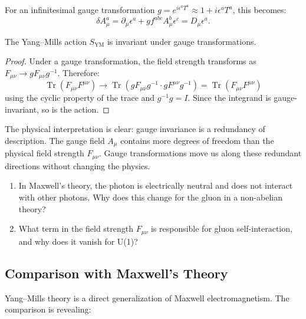 For an infinitesimal gauge transformation $g = e^{i\epsilon^a T^a} \approx 1 + i\epsilon^a T^a$, this becomes:
\[
\delta A_\mu^a = \partial_\mu \epsilon^a + g f^{abc} A_\mu^b \epsilon^c = D_\mu \epsilon^a.
\]

\begin{proposition}
The Yang--Mills action $S_{\mathrm{YM}}$ is invariant under gauge transformations.
\end{proposition}

\begin{proof}
Under a gauge transformation, the field strength transforms as $F_{\mu\nu} \to g F_{\mu\nu} g^{-1}$. Therefore:
\[
\operatorname{Tr}(F_{\mu\nu} F^{\mu\nu}) \to \operatorname{Tr}(g F_{\mu\nu} g^{-1} \cdot g F^{\mu\nu} g^{-1}) = \operatorname{Tr}(F_{\mu\nu} F^{\mu\nu})
\]
using the cyclic property of the trace and $g^{-1}g = I$. Since the integrand is gauge-invariant, so is the action.
\end{proof}

The physical interpretation is clear: gauge invariance is a redundancy of description. The gauge field $A_\mu$ contains more degrees of freedom than the physical field strength $F_{\mu\nu}$. Gauge transformations move us along these redundant directions without changing the physics.

\begin{checkyou}
\begin{enumerate}
\item In Maxwell's theory, the photon is electrically neutral and does not interact with other photons. Why does this change for the gluon in a non-abelian theory?
\item What term in the field strength $F_{\mu\nu}$ is responsible for gluon self-interaction, and why does it vanish for U(1)?
\end{enumerate}
\end{checkyou}

\subsection{Comparison with Maxwell's Theory}

Yang--Mills theory is a direct generalization of Maxwell electromagnetism. The comparison is revealing:

